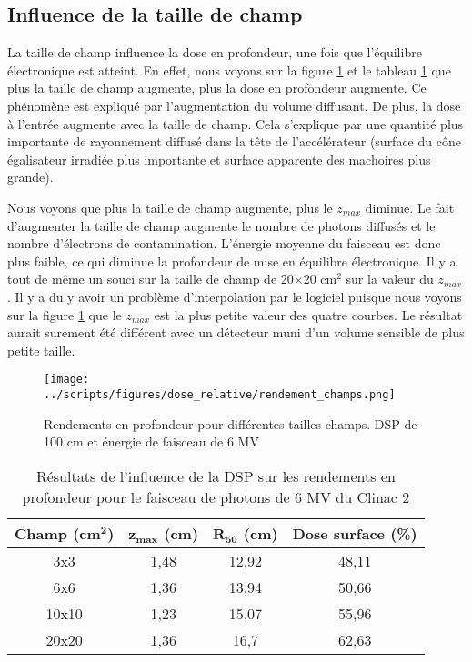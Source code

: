 \documentclass{book}
\begin{document}
\subsection{Influence de la taille de champ}

La taille de champ influence la dose en profondeur, une fois que l'équilibre électronique est atteint. En effet, nous voyons sur la figure \ref*{fig_rdt_champ} et le tableau \ref*{table_rdt_champ} que plus la taille de champ augmente, plus la dose en profondeur augmente. Ce phénomène est expliqué par l'augmentation du volume diffusant. De plus, la dose à l'entrée augmente avec la taille de champ. Cela s'explique par une quantité plus importante de rayonnement diffusé dans la tête de l'accélérateur (surface du cône égalisateur irradiée plus importante et surface apparente des machoires plus grande).

Nous voyons que plus la taille de champ augmente, plus le $z_{max}$ diminue. Le fait d'augmenter la taille de champ augmente le nombre de photons diffusés et le nombre d'électrons de contamination. L'énergie moyenne du faisceau est donc plus faible, ce qui diminue la profondeur de mise en équilibre électronique. Il y a tout de même un souci sur la taille de champ de 20$\times$20 cm$^2$ sur la valeur du $z_{max}$. Il y a du y avoir un problème d'interpolation par le logiciel puisque nous voyons sur la figure \ref*{fig_rdt_champ} que le $z_{max}$ est la plus petite valeur des quatre courbes. Le résultat aurait surement été différent avec un détecteur muni d'un volume sensible de plus petite taille.

\begin{figure}[h!]
  \centering
  \texttt{[image: ../scripts/figures/dose\_relative/rendement\_champs.png]}
  \caption{Rendements en profondeur pour différentes tailles champs. DSP de 100 cm et énergie de faisceau de 6 MV}
  \label{fig_rdt_champ}
\end{figure}

\begin{table}[h]
  \centering
  \begin{tabular}{cccc}
    \toprule
    \textbf{Champ (cm}$\mathbf{^2}$\textbf{)} & $\mathbf{z_{max}}$ \textbf{(cm)} & $\mathbf{R_{50}}$ \textbf{(cm)} & \textbf{Dose surface (\%)} \\
    \toprule
    3x3 & 1,48 & 12,92 & 48,11 \\
    6x6 & 1,36 & 13,94 &  50,66 \\
    10x10 & 1,23 & 15,07 & 55,96 \\
    20x20 & 1,36 & 16,7 & 62,63 \\
    \bottomrule
  \end{tabular}
  \caption{Résultats de l'influence de la DSP sur les rendements en profondeur pour le faisceau de photons de 6 MV du Clinac 2}
  \label{table_rdt_champ}
\end{table}
\end{document}

